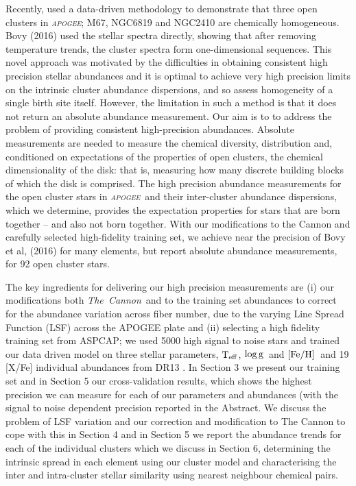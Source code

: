 \documentclass[14pt, preprint2]{aastex6}
\newcommand{\project}[1]{\textsl{#1}}
\newcommand{\tc}{\project{The~Cannon}}
\newcommand{\apogee}{\project{\textsc{apogee}}}
\newcommand{\teff}{\mbox{$\rm T_{eff}$}}
\newcommand{\feh}{\mbox{$\rm [Fe/H]$}}
\newcommand{\logg}{\mbox{$\rm \log g$}}
\begin{document}
Recently, \citet{Bovy2016} used a data-driven methodology to demonstrate that three open clusters in \apogee; M67, NGC6819 and NGC2410 are chemically homogeneous. Bovy (2016) used the stellar spectra directly, showing that after removing temperature trends, the cluster spectra form one-dimensional sequences. This novel approach was motivated by the difficulties in obtaining consistent high precision stellar abundances and it is optimal to achieve very high precision limits on the intrinsic cluster abundance dispersions, and so assess homogeneity of a single birth site itself. However, the limitation in such a method is that it does not return an absolute abundance measurement. Our aim is to to address the problem of providing consistent high-precision abundances.  Absolute measurements are needed to measure the chemical diversity, distribution and, conditioned on expectations of the properties of open clusters, the chemical dimensionality of the disk: that is, measuring how many discrete building blocks of which the disk is comprised.  The high precision abundance measurements for the open cluster stars in \apogee\ and their inter-cluster abundance dispersions, which we determine, provides the expectation properties for stars that are born together -- and also not born together. With our modifications to the Cannon and carefully selected high-fidelity training set, we achieve near the precision of Bovy et al, (2016) for many elements, but report absolute abundance measurements, for 92 open cluster stars. 

The key ingredients for delivering our high precision measurements are (i) our modifications both \tc\ and to the training set abundances to correct for the abundance variation across fiber number, due to the varying Line Spread Function (LSF) across the APOGEE plate and (ii) selecting a high fidelity training set from ASPCAP; we used 5000 high signal to noise stars and trained our data driven model on three stellar parameters, \teff, \logg\ and \feh\ and 19 [X/Fe] individual abundances from DR13 \citep{Holtzman2015}.   In Section 3 we present our training set and in Section 5 our cross-validation results, which shows the highest precision we can measure for each of our parameters and abundances (with the signal to noise dependent precision reported in the Abstract. We discuss the problem of LSF variation and our correction and modification to The Cannon to cope with this in Section 4 and in Section 5
we report the abundance trends for each of the individual clusters which we discuss in Section 6, determining the intrinsic spread in each element using our cluster model and characterising the inter and intra-cluster stellar similarity using nearest neighbour chemical pairs.  
\end{document}
